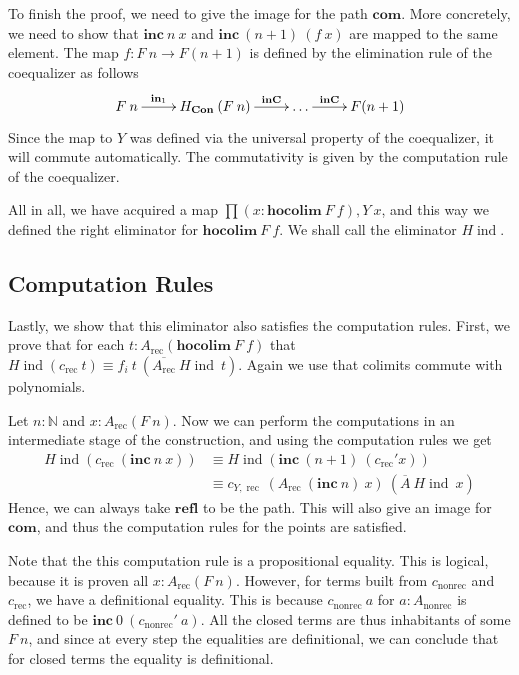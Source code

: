 \documentclass[a4paper,UKenglish]{lipics-v2016}
\newcommand{\Boperator}[1]{\mathrm{\mathbf{#1}}}
\newcommand{\inn}{\Boperator{in}}
\newcommand{\ind}[0]{\!\operatorname{ind}}
\newcommand{\rec}[0]{\operatorname{rec}}
\newcommand{\nonrec}[0]{\operatorname{nonrec}}
\newcommand{\Con}[0]{\textbf{Con}}
\newcommand{\refl}[0]{\Boperator{refl}}
\newcommand{\inC}[0]{\Boperator{inC}}
\newcommand{\hocolim}[0]{\Boperator{hocolim}}
\newcommand{\inc}[0]{\Boperator{inc}}
\newcommand{\com}[0]{\Boperator{com}}
\begin{document}
To finish the proof, we need to give the image for the path $\com$.
More concretely, we need to show that $\inc \> n \> x$ and $\inc \> (n+1) \> (f \> x)$ are mapped to the same element.
The map $f : F \> n \rightarrow F(n + 1)$ is defined by the elimination rule of the coequalizer as follows
\[
\xymatrix
{
        F \> n \ar[r]^-{\inn_1} & H_{\Con} \> (F \> n) \ar[r]^-{\inC} & \ldots \ar[r]^-{\inC} & F(n+1)
}
\]
Since the map to $Y$ was defined via the universal property of the coequalizer, it will commute automatically.
The commutativity is given by the computation rule of the coequalizer.

All in all, we have acquired a map $\prod (x : \hocolim \> F \> f), Y \> x$, and this way we defined the right eliminator for $\hocolim \> F \> f$.
We shall call the eliminator $H\ind$.

\subsection{Computation Rules}
Lastly, we show that this eliminator also satisfies the computation rules.
First, we prove that for each $t : A_{\rec}(\hocolim \> F \> f)$ that $H\ind(c_{\rec} \> t) \equiv f_i \> t \> (\overline{A_{\rec}} \> H\ind \> t)$.
Again we use that colimits commute with polynomials.

Let $n : \mathbb{N}$ and $x : A_{\rec}(F \> n)$.
Now we can perform the computations in an intermediate stage of the construction, and using the computation rules we get
\begin{equation*}
\begin{split}
H\ind(c_{\rec} \> (\inc \> n \> x)) 
&\equiv H\ind(\inc \> (n+1) \> (c_{\rec}' x)) \\
&\equiv c_{Y,\rec} \> (A_{\rec} \> (\inc \> n) \> x) \> (\overline{A} \> H\ind \> x)
\end{split}
\end{equation*}
Hence, we can always take $\refl$ to be the path.
This will also give an image for $\com$, and thus the computation rules for the points are satisfied.

Note that the this computation rule is a propositional equality.
This is logical, because it is proven all $x : A_{\rec}(F \> n)$.
However, for terms built from $c_{\nonrec}$ and $c_{\rec}$, we have a definitional equality.
This is because $c_{\nonrec} \> a$ for $a : A_{\nonrec}$ is defined to be $\inc \> 0 \> (c_{\nonrec}' \> a)$.
All the closed terms are thus inhabitants of some $F \> n$, and since at every step the equalities are definitional, we can conclude that for closed terms the equality is definitional.
\end{document}
